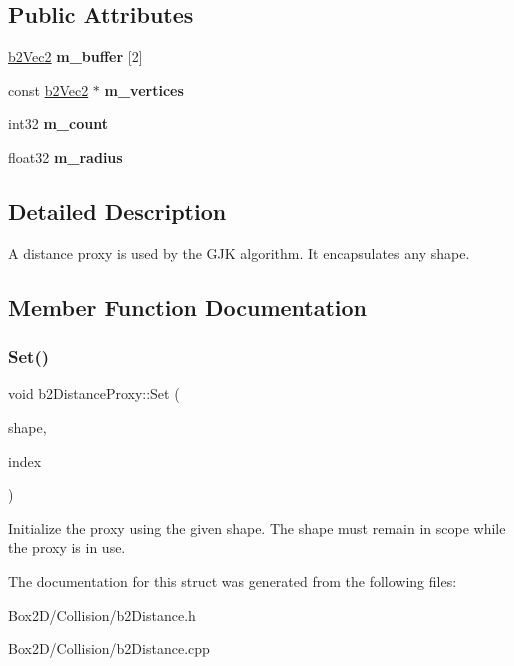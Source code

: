 \subsection*{Public Attributes}
\begin{DoxyCompactItemize}
\item 
\mbox{\label{structb2_distance_proxy_a3fc5ebfa3d34ac66390b88f9277fb330}} 
\hyperlink{structb2_vec2}{b2\+Vec2} {\bfseries m\+\_\+buffer} \mbox{[}2\mbox{]}
\item 
\mbox{\label{structb2_distance_proxy_abaf1495b8214b74d944b57170a762f32}} 
const \hyperlink{structb2_vec2}{b2\+Vec2} $\ast$ {\bfseries m\+\_\+vertices}
\item 
\mbox{\label{structb2_distance_proxy_ae36efab1361bb1f94e32f9b956c6f1b3}} 
int32 {\bfseries m\+\_\+count}
\item 
\mbox{\label{structb2_distance_proxy_a459c93f35b1e62d583bd73d8c478ce89}} 
float32 {\bfseries m\+\_\+radius}
\end{DoxyCompactItemize}


\subsection{Detailed Description}
A distance proxy is used by the G\+JK algorithm. It encapsulates any shape. 

\subsection{Member Function Documentation}
\mbox{\label{structb2_distance_proxy_a80a59a9c9e952482a8fc6db4b883365d}} 
\subsubsection{\texorpdfstring{Set()}{Set()}}
{\footnotesize\ttfamily void b2\+Distance\+Proxy\+::\+Set (\begin{DoxyParamCaption}\item[{const \hyperlink{classb2_shape}{b2\+Shape} $\ast$}]{shape,  }\item[{int32}]{index }\end{DoxyParamCaption})}

Initialize the proxy using the given shape. The shape must remain in scope while the proxy is in use. 

The documentation for this struct was generated from the following files\+:\begin{DoxyCompactItemize}
\item 
Box2\+D/\+Collision/b2\+Distance.\+h\item 
Box2\+D/\+Collision/b2\+Distance.\+cpp\end{DoxyCompactItemize}
